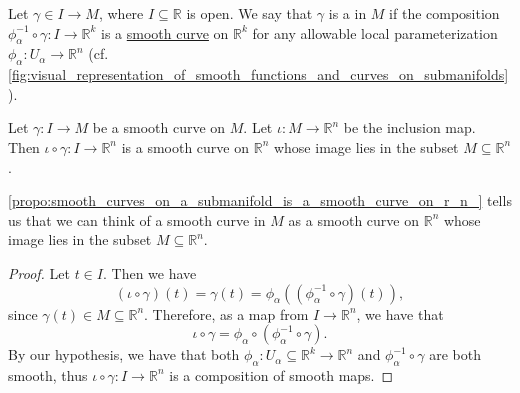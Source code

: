 \documentclass[notoc,notitlepage]{tufte-book}
\begin{document}

\begin{defn}\label{defn:smooth_curve_on_a_submanifold}
  Let $\gamma \in I \to M$, where $I \subseteq \mathbb{R}$ is open. We say that
  $\gamma$ is a  in $M$ if the composition
  $\phi_\alpha^{-1} \circ \gamma : I \to \mathbb{R}^k$ is a
  \hyperref[defn:smooth_curve]{smooth curve}  on $\mathbb{R}^k$ for any allowable local
  parameterization $\phi_\alpha : U_\alpha \to \mathbb{R}^n$ (cf.
  \cref{fig:visual_representation_of_smooth_functions_and_curves_on_submanifolds}).
\end{defn}

\begin{propo}\label{propo:smooth_curves_on_a_submanifold_is_a_smooth_curve_on_r_n_}
  Let $\gamma : I \to M$ be a smooth curve on $M$. Let $\iota : M \to
  \mathbb{R}^n$ be the inclusion map. Then $\iota \circ \gamma : I \to
  \mathbb{R}^n$ is a smooth curve on $\mathbb{R}^n$ whose image lies in the
  subset $M \subseteq \mathbb{R}^n$.
\end{propo}

\begin{remark}
  \cref{propo:smooth_curves_on_a_submanifold_is_a_smooth_curve_on_r_n_} tells us
  that we can think of a smooth curve in $M$ as a smooth curve on $\mathbb{R}^n$
  whose image lies in the subset $M \subseteq \mathbb{R}^n$.
\end{remark}

\begin{proof}
  Let $t \in I$. Then we have
  \begin{equation*}
    (\iota \circ \gamma)(t) = \gamma(t) = \phi_\alpha ((\phi_\alpha^{-1} \circ \gamma)(t)),
  \end{equation*}
  since $\gamma(t) \in M \subseteq \mathbb{R}^n$. Therefore, as a map from $I
  \to \mathbb{R}^n$, we have that
  \begin{equation*}
    \iota \circ \gamma = \phi_\alpha \circ ( \phi_\alpha^{-1} \circ \gamma ).
  \end{equation*}
  By our hypothesis, we have that both $\phi_\alpha : U_\alpha \subseteq \mathbb{R}^k
  \to \mathbb{R}^n$ and $\phi_\alpha^{-1} \circ \gamma$ are both smooth, thus
  $\iota \circ \gamma : I \to \mathbb{R}^n$ is a composition of smooth maps.
\end{proof}
\end{document}
